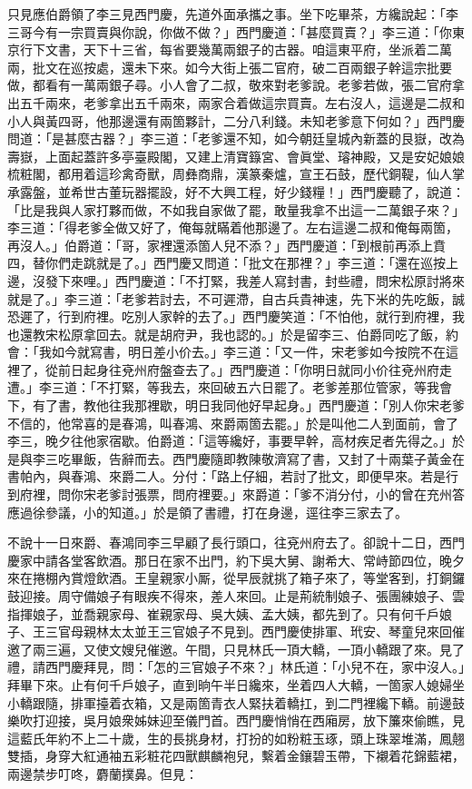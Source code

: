 只見應伯爵領了李三見西門慶，先道外面承攜之事。坐下吃畢茶，方纔說起：「李三哥今有一宗買賣與你說，你做不做？」西門慶道：「甚麼買賣？」李三道：「你東京行下文書，天下十三省，每省要幾萬兩銀子的古器。咱這東平府，坐派着二萬兩，批文在巡按處，還未下來。如今大街上張二官府，破二百兩銀子幹這宗批要做，都看有一萬兩銀子尋。小人會了二叔，敬來對老爹說。老爹若做，張二官府拿出五千兩來，老爹拿出五千兩來，兩家合着做這宗買賣。左右沒人，這邊是二叔和小人與黃四哥，他那邊還有兩箇夥計，二分八利錢。未知老爹意下何如？」西門慶問道：「是甚麼古器？」李三道：「老爹還不知，如今朝廷皇城內新蓋的艮嶽，改為壽嶽，上面起蓋許多亭臺殿閣，又建上清寶籙宮、會眞堂、璿神殿，又是安妃娘娘梳粧閣，都用着這珍禽奇獸，周彝商鼎，漢篆秦爐，宣王石鼓，歷代銅鞮，仙人掌承露盤，並希世古董玩器擺設，好不大興工程，好少錢糧！」{}西門慶聽了，說道：「比是我與人家打夥而做，不如我自家做了罷，敢量我拿不出這一二萬銀子來？」{}李三道：「得老爹全做又好了，俺每就瞞着他那邊了。左右這邊二叔和俺每兩箇，再沒人。」伯爵道：「哥，家裡還添箇人兒不添？」西門慶道：「到根前再添上賁四，替你們走跳就是了。」西門慶又問道：「批文在那裡？」李三道：「還在巡按上邊，沒發下來哩。」西門慶道：「不打緊，我差人寫封書，封些禮，問宋松原討將來就是了。」李三道：「老爹若討去，不可遲滯，自古兵貴神速，先下米的先吃飯，誠恐遲了，行到府裡。吃別人家幹的去了。」西門慶笑道：「不怕他，就行到府裡，我也還教宋松原拿回去。就是胡府尹，我也認的。」於是留李三、伯爵同吃了飯，約會：「我如今就寫書，明日差小价去。」李三道：「又一件，宋老爹如今按院不在這裡了，從前日起身往兗州府盤查去了。」西門慶道：「你明日就同小价往兗州府走遭。」李三道：「不打緊，等我去，來回破五六日罷了。老爹差那位管家，等我會下，有了書，教他往我那裡歇，明日我同他好早起身。」西門慶道：「別人你宋老爹不信的，他常喜的是春鴻，叫春鴻、來爵兩箇去罷。」於是叫他二人到面前，會了李三，晚夕往他家宿歇。伯爵道：「這等纔好，事要早幹，高材疾足者先得之。」於是與李三吃畢飯，告辭而去。西門慶隨即教陳敬濟寫了書，又封了十兩葉子黃金在書帕內，與春鴻、來爵二人。分付：「路上仔細，若討了批文，即便早來。若是行到府裡，問你宋老爹討張票，問府裡要。」來爵道：「爹不消分付，小的曾在充州答應過徐參議，小的知道。」於是領了書禮，打在身邊，逕往李三家去了。

不說十一日來爵、春鴻同李三早顧了長行頭口，往兗州府去了。卻說十二日，西門慶家中請各堂客飲酒。那日在家不出門，約下吳大舅、謝希大、常峙節四位，晚夕來在捲棚內賞燈飲酒。王皇親家小厮，從早辰就挑了箱子來了，等堂客到，打銅鑼鼓迎接。周守備娘子有眼疾不得來，差人來回。止是荊統制娘子、張團練娘子、雲指揮娘子，並喬親家母、崔親家母、吳大姨、孟大姨，都先到了。只有何千戶娘子、王三官母親林太太並王三官娘子不見到。{}西門慶使排軍、玳安、琴童兒來回催邀了兩三遍，又使文嫂兒催邀。午間，只見林氏一頂大轎，一頂小轎跟了來。見了禮，請西門慶拜見，問：「怎的三官娘子不來？」林氏道：「小兒不在，家中沒人。」拜畢下來。止有何千戶娘子，直到晌午半日纔來，坐着四人大轎，一箇家人媳婦坐小轎跟隨，排軍擡着衣箱，又是兩箇青衣人緊扶着轎扛，到二門裡纔下轎。前邊鼓樂吹打迎接，吳月娘衆姊妹迎至儀門首。西門慶悄悄在西廂房，放下簾來偷瞧，見這藍氏年約不上二十歲，生的長挑身材，打扮的如粉粧玉琢，頭上珠翠堆滿，鳳翹雙插，身穿大紅通袖五彩粧花四獸麒麟袍兒，繫着金鑲碧玉帶，下襯着花錦藍裙，兩邊禁步叮咚，麝蘭撲鼻。但見：

